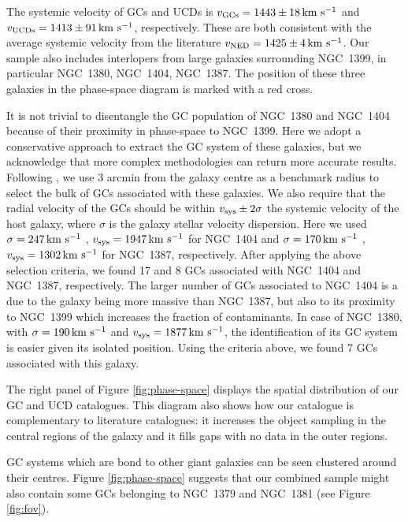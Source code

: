 \documentclass[useAMS,usenatbib]{mn2e}
\newcommand{\kms}{\mbox{\,km~s$^{-1}$}}
\begin{document}
The systemic velocity of GCs and UCDs is $v_{\rm GCs} = 1443 \pm 18 \kms$ and $v_{\rm UCDs} = 1413 \pm 91 \kms$, respectively. These are both consistent with the average systemic velocity from the literature $v_{\rm NED} = 1425 \pm 4 \kms$. Our sample also includes interlopers from large galaxies surrounding NGC~1399, in particular NGC~1380, NGC~1404, NGC~1387. The position of these three galaxies in the phase-space diagram is marked with a red cross. 

It is not trivial to disentangle the GC population of NGC~1380 and NGC~1404 because of their proximity in phase-space to NGC~1399. 
Here we adopt a conservative approach to extract the GC system of these galaxies, but we acknowledge that more complex methodologies can return more accurate results. Following \citet{Schuberth}, we use 3 arcmin from the galaxy centre as a benchmark radius to select the bulk of GCs associated with these galaxies. We also require that the radial velocity of the GCs should be within $v_{\rm sys} \pm 2\sigma$  the systemic velocity of the host galaxy, where $\sigma$ is the galaxy stellar velocity dispersion. Here we used $\sigma = 247 \kms$  \citep{Vanderbeke11}, $v_{\rm sys} = 1947 \kms$ for NGC~1404 and $\sigma = 170 \kms$ \citep{Wegner03}, $v_{\rm sys} = 1302\kms $ for NGC~1387, respectively. After applying the above selection criteria, we found 17 and 8 GCs associated with NGC~1404 and NGC~1387, respectively. The larger number of GCs associated to NGC~1404 is a due to the galaxy being more massive than NGC~1387, but also to its proximity to NGC~1399 which increases the fraction of contaminants.
In case of NGC~1380, with $\sigma = 190 \kms$  \citep{Vanderbeke11} and $v_{\rm sys} = 1877 \kms$, the identification of its GC system is easier given its isolated position. Using the criteria above, we found 7 GCs associated with this galaxy. 

The right panel of Figure \ref{fig:phase-space} displays the spatial distribution of our GC and UCD catalogues. This diagram also shows how our catalogue is complementary to literature catalogues: it increases the object sampling in the central regions of the galaxy and it fills gaps with no data in the outer regions. 

GC systems which are bond to other giant galaxies can be seen clustered around their centres. Figure \ref{fig:phase-space} suggests that our combined sample might also contain some GCs belonging to NGC~1379 and NGC~1381 (see Figure \ref{fig:fov}). 
\end{document}
